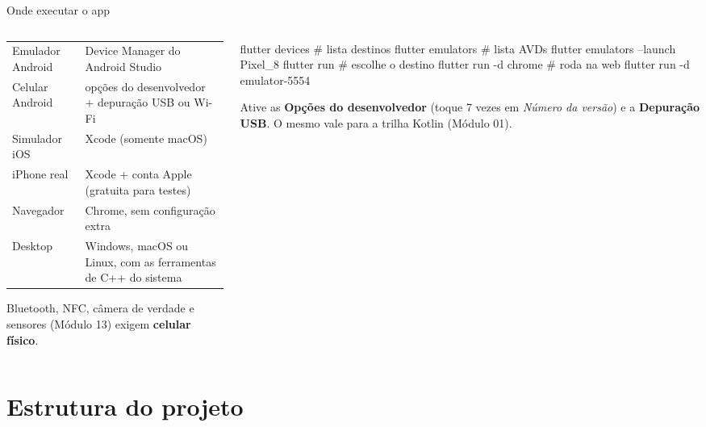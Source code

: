 \documentclass[aspectratio=169,10pt]{beamer}
\begin{document}
\begin{frame}[fragile]{Onde executar o app}
  \begin{columns}[T]
    \begin{column}{0.5\textwidth}
      \scriptsize
      \begin{tabularx}{\linewidth}{@{}l L@{}}
        \toprule
         &  \\
        \midrule
        Emulador Android & Device Manager do Android Studio \\
        Celular Android & opções do desenvolvedor + depuração USB ou Wi-Fi \\
        Simulador iOS & Xcode (somente macOS) \\
        iPhone real & Xcode + conta Apple (gratuita para testes) \\
        Navegador & Chrome, sem configuração extra \\
        Desktop & Windows, macOS ou Linux, com as ferramentas de C++ do sistema \\
        \bottomrule
      \end{tabularx}
      \begin{atencao}
        Bluetooth, NFC, câmera de verdade e sensores (Módulo 13) exigem \textbf{celular físico}.
      \end{atencao}
    \end{column}
    \begin{column}{0.48\textwidth}
\begin{terminal}[title=Dispositivos pelo terminal]
flutter devices              # lista destinos
flutter emulators            # lista AVDs
flutter emulators --launch Pixel_8
flutter run                  # escolhe o destino
flutter run -d chrome        # roda na web
flutter run -d emulator-5554
\end{terminal}
      \begin{dica}
        Ative as \textbf{Opções do desenvolvedor} (toque 7 vezes em \emph{Número da versão}) e a \textbf{Depuração USB}. O mesmo vale para a trilha Kotlin (Módulo 01).
      \end{dica}
    \end{column}
  \end{columns}
\end{frame}

\section{Estrutura do projeto}
\end{document}
